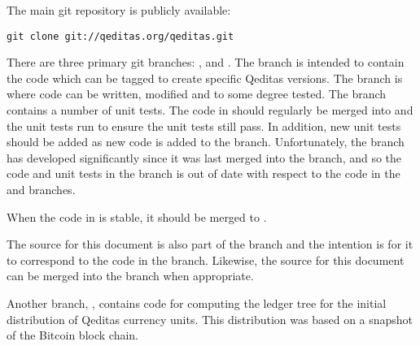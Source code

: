 The main git repository is publicly available:
\begin{verbatim}
git clone git://qeditas.org/qeditas.git
\end{verbatim}

There are three primary git branches: \master, {\dev} and \testing.
The {\master} branch is intended to contain the code which can be tagged to create
specific Qeditas versions.
The {\dev} branch is where code can be written, modified and to some degree tested.
The {\testing} branch contains a number of unit tests.
The code in {\dev} should regularly be merged into {\testing} and
the unit tests run to ensure the unit tests still pass.
In addition, new unit tests should be added as new code is added to the {\dev} branch.
Unfortunately, the {\dev} branch has developed significantly since it was last merged into the {\testing} branch,
and so the code and unit tests in the
{} branch is out of date with respect to the code in the {} and {} branches.

When the code in {\dev} is stable, it should be merged to \master.

The source for this document is also part of the {\dev} branch and
the intention is for it to correspond to the code in the {\dev} branch.
Likewise, the source for this document can be merged into the {\master} branch
when appropriate.

Another branch, \initdistr, contains code for computing the ledger tree for
the initial distribution of Qeditas currency units. This distribution
was based on a snapshot of the Bitcoin block chain.

